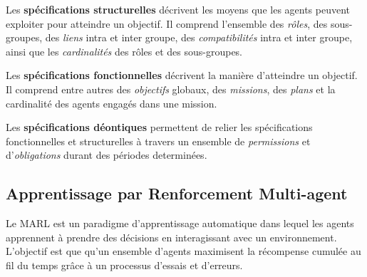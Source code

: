 \documentclass[demonstration]{jfsma}
\begin{document}
Les \textbf{spécifications structurelles} décrivent les moyens que les agents peuvent exploiter pour atteindre un objectif. Il comprend l'ensemble des \emph{rôles}, des sous-groupes, des \emph{liens} intra et inter groupe, des \emph{compatibilités} intra et inter groupe, ainsi que les \emph {cardinalités} des rôles et des sous-groupes.

Les \textbf{spécifications fonctionnelles} décrivent la manière d'atteindre un objectif. Il comprend entre autres des \emph{objectifs} globaux, des \emph{missions}, des \emph{plans} et la cardinalité des agents engagés dans une mission.

Les \textbf{spécifications déontiques} permettent de relier les spécifications fonctionnelles et structurelles à travers un ensemble de \emph{permissions} et d'\emph{obligations} durant des périodes determinées.


\subsection{Apprentissage par Renforcement Multi-agent}

Le MARL est un paradigme d'apprentissage automatique dans lequel les agents apprennent à prendre des décisions en interagissant avec un environnement. L’objectif est que qu'un ensemble d'agents maximisent la récompense cumulée au fil du temps grâce à un processus d’essais et d’erreurs.
\end{document}
